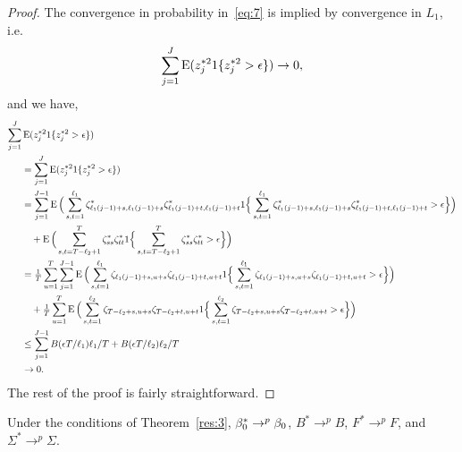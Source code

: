 \documentclass[12pt,fleqn]{article}
\begin{document}
\begin{proof}
   The convergence in probability in~\eqref{eq:7} is implied by
   convergence in $L_1$, i.e.
   \begin{equation*}
     \sum_{j=1}^J \operatorname{E}(z_j^{*2} 1\{z_j^{*2} > \epsilon\}) \to 0,
   \end{equation*}
   and we have,
   \begin{align*}
     \sum_{j=1}^J &\operatorname{E}(z_j^{*2} 1\{z_j^{*2} > \epsilon\}) \\
     &= \sum_{j=1}^J \operatorname{E}(z_j^{*2} 1\{z_j^{*2} > \epsilon\}) \\
     &= \sum_{j=1}^{J-1} \operatorname{E}\Big(\sum_{s,t =1}^{\ell_1} \zeta^*_{\ell_1 (j-1)+s,\ell_1 (j-1)+s}\zeta^*_{\ell_1 (j-1)+t,\ell_1 (j-1)+t}
     1\Big\{ \sum_{s,t = 1}^{\ell_1} \zeta^*_{\ell_1 (j-1)+s,\ell_1 (j-1)+s}\zeta^*_{\ell_1 (j-1)+t,\ell_1 (j-1)+t} > \epsilon\Big\}\Big) \\
     &\quad +
     \operatorname{E}\Big(\sum_{s,t = T-\ell_2+1}^{T} \zeta^*_{ss}\zeta^*_{tt} 1\Big\{\sum_{s,t = T - \ell_2+1}^{T} \zeta^*_{ss}\zeta^*_{tt} > \epsilon\Big\}\Big) \\
     &= \tfrac{1}{T} \sum_{u=1}^T \sum_{j=1}^{J-1} \operatorname{E}\Big(\sum_{s,t = 1}^{\ell_1} \zeta_{\ell_1(j-1) + s,u+s}\zeta_{\ell_1(j-1) + t,u+t}
     1\Big\{\sum_{s,t = 1}^{\ell_1} \zeta_{\ell_1(j-1) + s,u+s}\zeta_{\ell_1(j-1) + t,u+t} > \epsilon\Big\}\Big) \\
     &\quad +
     \tfrac{1}{T} \sum_{u=1}^T \operatorname{E}\Big(\sum_{s,t = 1}^{\ell_2} \zeta_{T-\ell_2 + s,u+s}\zeta_{T-\ell_2+t,u+t}
     1\Big\{\sum_{s,t = 1}^{\ell_2} \zeta_{T-\ell_2 + s,u+s}\zeta_{T-\ell_2+t,u+t} > \epsilon\Big\}\Big) \\
     &\leq \sum_{j=1}^{J-1} B(\epsilon T / \ell_1) \ell_1 / T
     + B(\epsilon T / \ell_2) \ell_2/T \\
     &\to 0.
   \end{align*}
   The rest of the proof is fairly straightforward.
\end{proof}

\begin{lema}\label{res:a3}
  Under the conditions of Theorem~\ref{res:3}, $\beta_0^* \to^p
  \beta_0$, $B^* \to^p B$, $F^* \to^p F$, and $\Sigma^* \to^p \Sigma$.
\end{lema}
\end{document}
